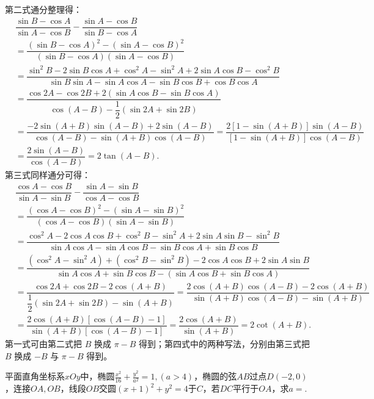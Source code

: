 \begin{solution}
第二式通分整理得：
\begin{align*}
&\dfrac{\sin B - \cos A}{\sin A - \cos B} - \dfrac{\sin A - \cos B}{\sin B - \cos A}\\[1.2ex]
&=\dfrac{(\sin B - \cos A)^2 - (\sin A - \cos B)^2}{(\sin B - \cos A)\left(\sin A - \cos B\right)}\\[1.2ex]
&=\dfrac{\sin^2 B - 2\sin B \cos A + \cos^2 A - \sin^2 A + 2\sin A \cos B - \cos^2 B}{\sin B \sin A - \sin A \cos A - \sin B \cos B + \cos B \cos A}\\[1.2ex]
&=\dfrac{\cos 2A - \cos 2B + 2\left(\sin A \cos B - \sin B \cos A\right)}{\cos\left(A - B\right) - \dfrac{1}{2}\left(\sin 2A + \sin 2B\right)}\\[1.2ex]
&=\dfrac{-2\sin\left(A + B\right)\sin\left(A - B\right) + 2\sin\left(A - B\right)}{\cos\left(A - B\right) - \sin\left(A + B\right)\cos\left(A - B\right)}
=\dfrac{2\left[1 - \sin\left(A + B\right)\right]\sin\left(A - B\right)}{\left[1 - \sin\left(A + B\right)\right]\cos\left(A - B\right)}
\\[1.2ex]&=\dfrac{2\sin\left(A - B\right)}{\cos\left(A - B\right)} = 2\tan\left(A - B\right).
\end{align*}
第三式同样通分可得：
\begin{align*}
&\dfrac{\cos A - \cos B}{\sin A - \sin B} - \dfrac{\sin A - \sin B}{\cos A - \cos B}\\[1.2ex]
&=\dfrac{(\cos A - \cos B)^2 - (\sin A - \sin B)^2}{(\cos A - \cos B)(\sin A - \sin B)}\\[1.2ex]
&=\dfrac{\cos^2 A - 2\cos A\cos B + \cos^2 B - \sin^2 A + 2\sin A\sin B - \sin^2 B}{\sin A\cos A - \sin A\cos B - \sin B\cos A + \sin B\cos B}\\[1.2ex]
&=\dfrac{(\cos^2 A - \sin^2 A) + (\cos^2 B - \sin^2 B) - 2\cos A\cos B + 2\sin A\sin B}{\sin A\cos A + \sin B\cos B - (\sin A\cos B + \sin B\cos A)}\\[1.2ex]
&=\dfrac{\cos 2A + \cos 2B - 2\cos(A + B)}{\dfrac{1}{2}(\sin 2A + \sin 2B) - \sin(A + B)}
=\dfrac{2\cos(A + B)\cos(A - B) - 2\cos(A + B)}{\sin(A + B)\cos(A - B) - \sin(A + B)}\\[1.2ex]
&=\dfrac{2\cos(A + B)[\cos(A - B) - 1]}{\sin(A + B)[\cos(A - B) - 1]}
=\dfrac{2\cos(A + B)}{\sin(A + B)} = 2\cot(A + B).
\end{align*}
第一式可由第二式把 $B$ 换成 $\pi-B$ 得到；第四式中的两种写法，分别由第三式把 $B$ 换成 $-B$ 与 $\pi-B$ 得到。
\end{solution}
\newpage
\begin{example}[（椭圆弦与平行条件）]
    平面直角坐标系$xOy$中，椭圆$\frac{x^2}{16}+\frac{y^2}{a^2}=1,(a>4)$，椭圆的弦$AB$过点$D(-2,0)$，连接$OA,OB$，线段$OB$交圆$(x+1)^2+y^2=4$于$C$，若$DC$平行于$OA$，求$a=$\underline{\hspace{1.2cm}}.
\end{example}
